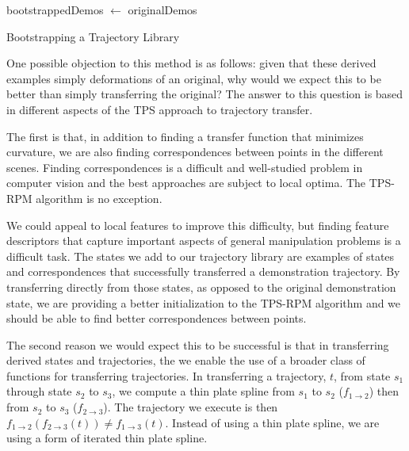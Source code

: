 \begin{algorithm}[H]

 bootstrappedDemos $\leftarrow$ originalDemos\;
 \caption{Bootstrapping a Trajectory Library}
 \label{alg:bootstrap}
\end{algorithm}

One possible objection to this method is as follows: given that these derived examples
simply deformations of an original, why would we expect this to be better than simply
transferring the original? The answer to this question is based in different
aspects of the TPS approach to trajectory transfer.

The first is that, in addition to finding a transfer function that minimizes curvature,
we are also finding correspondences between points in the different scenes. Finding 
correspondences is a difficult and well-studied problem in computer vision and the best
approaches are subject to local optima. The TPS-RPM algorithm is no exception. 

We could appeal to local features to improve this difficulty, but finding feature descriptors 
that capture important aspects of general manipulation problems is a difficult task. The
states we add to our trajectory library are examples of states and correspondences that 
successfully transferred a demonstration trajectory. By transferring directly from those
states, as opposed to the original demonstration state, we are providing a better 
initialization to the TPS-RPM algorithm and we should be able to find better correspondences
between points.

The second reason we would expect this to be successful is that in transferring derived
states and trajectories, the we enable the use of a broader class of functions for 
transferring trajectories. In transferring a trajectory, $t$, from state $s_1$ through
state $s_2$ to $s_3$, we compute a thin plate spline from $s_1$ to $s_2$ 
($f_{1\rightarrow 2}$) then from $s_2$ to $s_3$ ($f_{2\rightarrow 3}$). The trajectory we
execute is then $f_{1\rightarrow 2}(f_{2\rightarrow 3}(t)) \ne f_{1\rightarrow 3}(t)$. 
Instead of using a thin plate spline, we are using a form of iterated thin plate spline.

